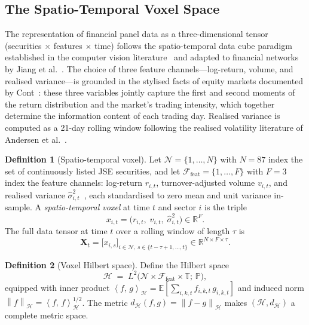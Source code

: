 \documentclass[11pt,a4paper]{article}  %
\newcommand{\R}{\mathbb{R}}
\newcommand{\E}{\mathbb{E}}
\newcommand{\Prob}{\mathbb{P}}
\newcommand{\Hilbert}{\mathcal{H}}
\newcommand{\norm}[1]{\left\lVert#1\right\rVert}
\newcommand{\inner}[2]{\left\langle#1,\,#2\right\rangle}
\theoremstyle{plain}
\theoremstyle{definition}
\newtheorem{definition}{Definition}[section]
\theoremstyle{remark}
\begin{document}
\subsection{The Spatio-Temporal Voxel Space}
\label{subsec:voxel}

The representation of financial panel data as a three-dimensional
tensor (securities $\times$ features $\times$ time) follows the
spatio-temporal data cube paradigm established in the computer
vision literature~\cite{Ji2013} and adapted to financial networks
by Jiang et al.~\cite{Jiang2021}. The choice of three feature
channels---log-return, volume, and realised variance---is grounded
in the stylised facts of equity markets documented by Cont~\cite{Cont2001}:
these three variables jointly capture the first and second moments
of the return distribution and the market's trading intensity, which
together determine the information content of each trading day.
Realised variance is computed as a 21-day rolling window following
the realised volatility literature of Andersen et al.~\cite{Andersen2003}.

\begin{definition}[Spatio-temporal voxel]
\label{def:voxel}
Let $\mathcal{N} = \{1,\ldots,N\}$ with $N = 87$ index the set
of continuously listed JSE securities, and let
$\mathcal{F}_{\mathrm{feat}} = \{1,\ldots,F\}$ with $F = 3$
index the feature channels: log-return $r_{i,t}$, turnover-adjusted
volume $v_{i,t}$, and realised variance $\hat{\sigma}^2_{i,t}$~\cite{Andersen2003},
each standardised to zero mean and unit variance in-sample. A
\emph{spatio-temporal voxel} at time $t$ and sector $i$ is the
triple
\[
   x_{i,t} = \bigl(r_{i,t},\; v_{i,t},\; \hat{\sigma}^2_{i,t}\bigr)
   \in \R^{F}.
\]
The full data tensor at time $t$ over a rolling window of length
$\tau$ is
\[
   \mathbf{X}_t = \bigl[x_{i,s}\bigr]_{i\in\mathcal{N},\,
   s\in\{t-\tau+1,\ldots,t\}} \in \R^{N \times F \times \tau}.
\]
\end{definition}

\begin{definition}[Voxel Hilbert space]
\label{def:hilbert}
Define the Hilbert space
\[
   \Hilbert \;=\; L^{2}\!\bigl(\mathcal{N}\times\mathcal{F}_{\mathrm{feat}}
   \times\mathbb{T};\,\Prob\bigr),
\]
equipped with inner product
$\inner{f}{g}_{\Hilbert} = \E\!\left[\sum_{i,k,t} f_{i,k,t}\,g_{i,k,t}\right]$
and induced norm $\norm{f}_{\Hilbert} = \inner{f}{f}_{\Hilbert}^{1/2}$.
The metric $d_{\Hilbert}(f,g) = \norm{f-g}_{\Hilbert}$ makes
$(\Hilbert, d_{\Hilbert})$ a complete metric space.
\end{definition}
\end{document}
